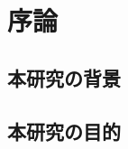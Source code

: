 \documentclass[./Main.tex]{subfiles}
\begin{document}
\chapter{序論}
\section{本研究の背景}
\cite{liu2022}

\section{本研究の目的}

\ifSubfilesClassLoaded{


}{}
\end{document}
